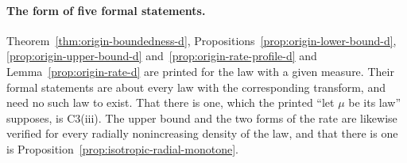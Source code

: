 \paragraph{The form of five formal statements.} Theorem~\ref{thm:origin-boundedness-d},
Propositions~\ref{prop:origin-lower-bound-d}, \ref{prop:origin-upper-bound-d}
and~\ref{prop:origin-rate-profile-d} and Lemma~\ref{prop:origin-rate-d} are printed for the law
with a
given \Levy{} measure. Their formal statements are about every law with the corresponding
transform, and need no such law to exist. That there is one, which the printed ``let $\mu$ be
its law'' supposes, is C3(iii). The upper bound and the two forms of the rate are likewise
verified for every radially nonincreasing density of the law, and that there is one is
Proposition~\ref{prop:isotropic-radial-monotone}.

